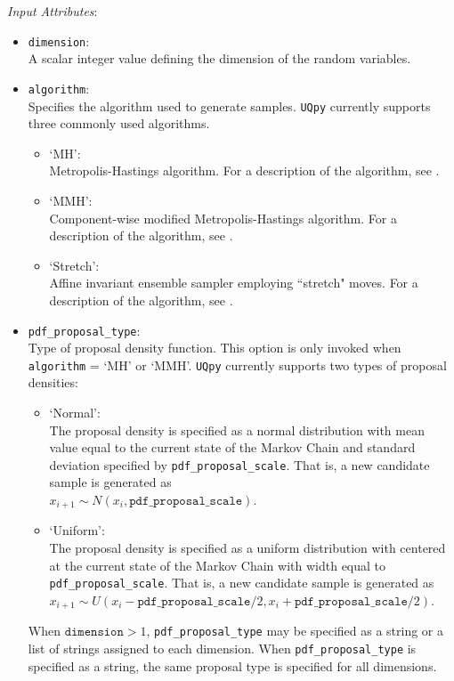 \documentclass[./UsersGuide.tex]{subfiles}
\begin{document}
\noindent\textit{Input Attributes}:
\begin{itemize}
\item \texttt{dimension}:\\ 
	A scalar integer value defining the dimension of the random variables. 
\item \texttt{algorithm}: \\ 
	Specifies the algorithm used to generate samples. \texttt{UQpy} currently supports three commonly used algorithms.
	\begin{itemize}
		\item `MH': \\ 
			Metropolis-Hastings algorithm. For a description of the algorithm, see \cite{Metropolis1953,Hastings1970,Au2001}. 
		\item `MMH': \\ 
			Component-wise modified Metropolis-Hastings algorithm. For a description of the algorithm, see \cite{Au2001}. 
		\item `Stretch': \\ 
			Affine invariant ensemble sampler employing ``stretch" moves. For a description of the algorithm, see \cite{Goodman2010}.
	\end{itemize} 
\item \texttt{pdf\_proposal\_type}:\\ 
	Type of proposal density function. This option is only invoked when \texttt{algorithm} = `MH' or `MMH'. \texttt{UQpy} currently supports two types of proposal densities:
	\begin{itemize}
		\item `Normal': \\
			The proposal density is specified as a normal distribution with mean value equal to the current state of the Markov Chain and standard deviation specified by 						\texttt{pdf\_proposal\_scale}. That is, a new candidate sample is generated as\\ $x_{i+1}\sim N(x_i,\texttt{pdf\_proposal\_scale})$.
		\item `Uniform': \\
			The proposal density is specified as a uniform distribution with centered at the current state of the Markov Chain with width equal to \texttt{pdf\_proposal\_scale}. That is, a 			new candidate sample is generated as\\ $x_{i+1}\sim U(x_i-\texttt{pdf\_proposal\_scale}/2,x_i+\texttt{pdf\_proposal\_scale}/2)$.
		\end{itemize}
		When $\texttt{dimension}>1$, \texttt{pdf\_proposal\_type} may be specified as a string or a list of strings assigned to each dimension. When \texttt{pdf\_proposal\_type} is 			specified as a string, the same proposal type is specified for all dimensions.

\end{itemize}
\end{document}
